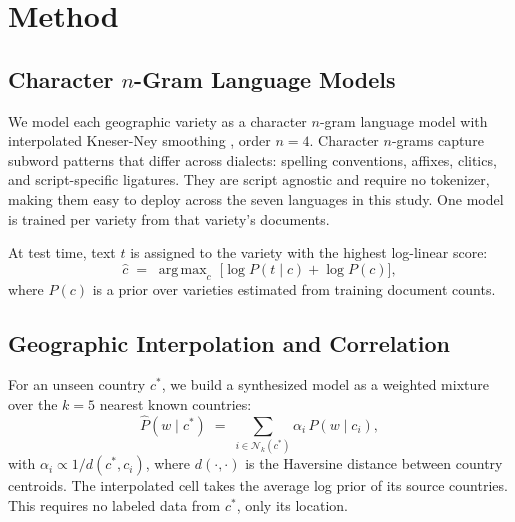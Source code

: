 \documentclass[11pt]{article}
\DeclareMathOperator*{\argmax}{arg\,max}
\begin{document}
\section{Method}
\label{sec:method}

\subsection{Character $n$-Gram Language Models}

We model each geographic variety as a character $n$-gram language model with interpolated Kneser-Ney smoothing \cite{chen-goodman-1999-empirical}, order $n{=}4$.
Character $n$-grams capture subword patterns that differ across dialects: spelling conventions, affixes, clitics, and script-specific ligatures.
They are script agnostic and require no tokenizer, making them easy to deploy across the seven languages in this study.
One model is trained per variety from that variety's documents.

At test time, text $t$ is assigned to the variety with the highest log-linear score:
\begin{equation}
  \hat{c} \;=\; \argmax_{c} \; \bigl[\log P(t \mid c) + \log P(c)\bigr],
  \label{eq:classifier}
\end{equation}
where $P(c)$ is a prior over varieties estimated from training document counts.

\subsection{Geographic Interpolation and Correlation}
\label{sec:corr_def}

For an unseen country $c^*$, we build a synthesized model as a weighted mixture over the $k{=}5$ nearest known countries:
%
\begin{equation}
  \hat{P}(w \mid c^*) \;=\; \sum_{i \in \mathcal{N}_k(c^*)}
    \alpha_i \, P(w \mid c_i),
  \label{eq:mixture}
\end{equation}
%
with $\alpha_i \propto 1/d(c^*, c_i)$, where $d(\cdot,\cdot)$ is the Haversine distance between country centroids.
The interpolated cell takes the average log prior of its source countries.
This requires no labeled data from $c^*$, only its location.
\end{document}
